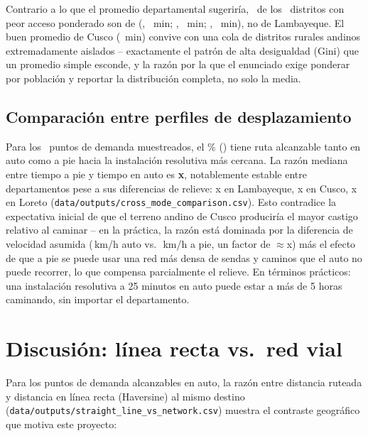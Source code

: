 \documentclass[11pt]{article}
\begin{document}


Contrario a lo que el promedio departamental sugeriría,
\statTopGapsDeptModeCount\ de los \statTopGapsN\ distritos con peor acceso
ponderado son de \textbf{\statTopGapsDeptMode}
(\statTopGapsModeFirstDist, \statTopGapsModeFirstTime\ min;
\statTopGapsModeSecondDist, \statTopGapsModeSecondTime\ min;
\statTopGapsModeThirdDist, \statTopGapsModeThirdTime\ min), no de Lambayeque. El
buen promedio de Cusco (\statMeanAccessCusco\ min)
convive con una cola de distritos rurales andinos extremadamente aislados
-- exactamente el patrón de alta desigualdad (Gini) que un promedio simple
esconde, y la razón por la que el enunciado exige ponderar por población y
reportar la distribución completa, no solo la media.

\subsection{Comparación entre perfiles de desplazamiento}

Para los \statNSampled\ puntos de demanda muestreados, el
\statPctBothRoutable\% (\statNBothRoutable) tiene ruta alcanzable tanto en
auto como a pie hacia la instalación resolutiva más cercana. La razón
mediana entre tiempo a pie y tiempo en auto es \textbf{\statWalkCarRatio x},
notablemente estable entre departamentos pese a sus diferencias de
relieve: \statWalkCarRatioLambayeque x en Lambayeque, \statWalkCarRatioCusco x
en Cusco, \statWalkCarRatioLoreto x en Loreto
(\texttt{data/outputs/cross\_mode\_comparison.csv}). Esto contradice
la expectativa inicial de que el terreno andino de Cusco produciría el
mayor castigo relativo al caminar -- en la práctica, la razón está
dominada por la diferencia de velocidad asumida (\statSpeedCar\,km/h auto
vs.\ \statSpeedFoot\,km/h a pie, un factor de $\approx$\statSpeedRatioCarFoot x)
más el efecto de que a pie se
puede usar una red más densa de sendas y caminos que el auto no puede
recorrer, lo que compensa parcialmente el relieve. En términos prácticos:
una instalación resolutiva a 25 minutos en auto puede estar a más de 5
horas caminando, sin importar el departamento.

\section{Discusión: línea recta vs.\ red vial}

Para los puntos de demanda alcanzables en auto, la razón entre distancia
ruteada y distancia en línea recta (Haversine) al mismo destino
(\texttt{data/outputs/straight\_line\_vs\_network.csv}) muestra el
contraste geográfico que motiva este proyecto:
\end{document}
